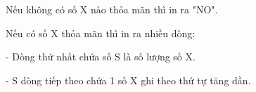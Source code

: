 Nếu không có số X nào thỏa mãn thì in ra "NO".

Nếu có số X thỏa mãn thì in ra nhiều dòng:


- Dòng thứ nhất chứa số S là số lượng số X.


- S dòng tiếp theo chứa 1 số X ghi theo thứ tự tăng dần.